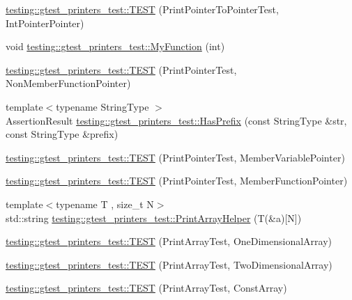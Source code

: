 \begin{DoxyCompactItemize}
\item 
\mbox{\hyperlink{namespacetesting_1_1gtest__printers__test_afee54807b15b623718c62008bd743d4b}{testing\+::gtest\+\_\+printers\+\_\+test\+::\+T\+E\+ST}} (Print\+Pointer\+To\+Pointer\+Test, Int\+Pointer\+Pointer)
\item 
void \mbox{\hyperlink{namespacetesting_1_1gtest__printers__test_adf0e590d6776ecb7095a989ff2272d7b}{testing\+::gtest\+\_\+printers\+\_\+test\+::\+My\+Function}} (int)
\item 
\mbox{\hyperlink{namespacetesting_1_1gtest__printers__test_aa3cb60cf6f3a4a0cd7d9873cd597ffd8}{testing\+::gtest\+\_\+printers\+\_\+test\+::\+T\+E\+ST}} (Print\+Pointer\+Test, Non\+Member\+Function\+Pointer)
\item 
{\footnotesize template$<$typename String\+Type $>$ }\\Assertion\+Result \mbox{\hyperlink{namespacetesting_1_1gtest__printers__test_abbd436200da6c80944c8a7504fb56ea1}{testing\+::gtest\+\_\+printers\+\_\+test\+::\+Has\+Prefix}} (const String\+Type \&str, const String\+Type \&prefix)
\item 
\mbox{\hyperlink{namespacetesting_1_1gtest__printers__test_a434cafcc1dbee409992bbb1593034480}{testing\+::gtest\+\_\+printers\+\_\+test\+::\+T\+E\+ST}} (Print\+Pointer\+Test, Member\+Variable\+Pointer)
\item 
\mbox{\hyperlink{namespacetesting_1_1gtest__printers__test_a9d998b210890d3d7e085d01c457f650f}{testing\+::gtest\+\_\+printers\+\_\+test\+::\+T\+E\+ST}} (Print\+Pointer\+Test, Member\+Function\+Pointer)
\item 
{\footnotesize template$<$typename T , size\+\_\+t N$>$ }\\std\+::string \mbox{\hyperlink{namespacetesting_1_1gtest__printers__test_a694f23c5a8c134f0e6e24a412f8d75c1}{testing\+::gtest\+\_\+printers\+\_\+test\+::\+Print\+Array\+Helper}} (T(\&a)\mbox{[}N\mbox{]})
\item 
\mbox{\hyperlink{namespacetesting_1_1gtest__printers__test_a3845c4717b03cb5ad309c7d9a37acb0a}{testing\+::gtest\+\_\+printers\+\_\+test\+::\+T\+E\+ST}} (Print\+Array\+Test, One\+Dimensional\+Array)
\item 
\mbox{\hyperlink{namespacetesting_1_1gtest__printers__test_ac366b9ec749b2499d21583d3b8f86273}{testing\+::gtest\+\_\+printers\+\_\+test\+::\+T\+E\+ST}} (Print\+Array\+Test, Two\+Dimensional\+Array)
\item 
\mbox{\hyperlink{namespacetesting_1_1gtest__printers__test_a8b5638f178c12f58707ca0f02a3b4d41}{testing\+::gtest\+\_\+printers\+\_\+test\+::\+T\+E\+ST}} (Print\+Array\+Test, Const\+Array)

\end{DoxyCompactItemize}
